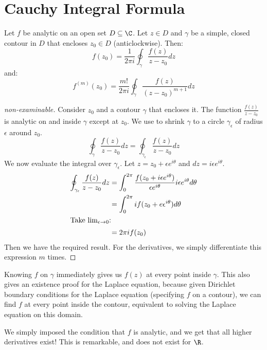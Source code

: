 \documentclass[../Main.tex]{subfiles}
\begin{document}
\section{Cauchy Integral Formula}
\begin{theorem}
    Let $f$ be analytic on an open set $D \subseteq \C$. Let $z \in D$ and $\gamma$ be a simple, closed contour in $D$ that encloses $z_0 \in D$ (anticlockwise). Then:
    \begin{equation*}
        f(z_0) = \frac{1}{2\pi i} \oint_\gamma \frac{f(z)}{z - z_0} dz
    \end{equation*}
    and:
    \begin{equation*}
        f^{(m)}(z_0) = \frac{m!}{2\pi i} \oint_\gamma \frac{f(z)}{(z - z_0)^{m+1}} dz
    \end{equation*}
    \label{thmCauchyIntegral}
\end{theorem}
\begin{proof}[non-examinable]
    Consider $z_0$ and a contour $\gamma$ that encloses it. 
    The function $\frac{f(z)}{z - z_0}$ is analytic on and inside $\gamma$ except at $z_0$. We use  to shrink $\gamma$ to a circle $\gamma_\epsilon$ of radius $\epsilon$ around $z_0$.
    \begin{equation*}
        \oint_\gamma \frac{f(z)}{z - z_0} dz = \oint_{\gamma_{\epsilon}} \frac{f(z)}{z - z_0} dz
    \end{equation*}
    We now evaluate the integral over $\gamma_\epsilon$. Let $z = z_0 + \epsilon e^{i\theta}$ and $dz = i \epsilon e^{i\theta}$.
    \begin{align*}
        \oint_{\gamma_\epsilon} \frac{f(z)}{z - z_0} dz &= \int_{0}^{2\pi} \frac{f(z_0 + i \epsilon e^{i\theta})}{\epsilon e^{i\theta}} i \epsilon e^{i\theta} d\theta \\
        &= \int_{0}^{2\pi} if(z_0 + e\epsilon^{i\theta}) d\theta \\
        \intertext{Take $\lim_{\epsilon \to 0}$:}
        &= 2\pi i f(z_0)
    \end{align*}
    Then we have the required result. For the derivatives, we simply differentiate this expression $m$ times.
\end{proof}
\begin{remarks}
    \item Knowing $f$ on $\gamma$ immediately gives us $f(z)$ at every point inside $\gamma$. This also gives an existence proof for the Laplace equation, because given Dirichlet boundary conditions for the Laplace equation (specifying $f$ on a contour), we can find $f$ at every point inside the contour, equivalent to solving the Laplace equation on this domain.
    \item We simply imposed the condition that $f$ is analytic, and we get that all higher derivatives exist! This is remarkable, and does not exist for $\R$.
\end{remarks}
\end{document}
